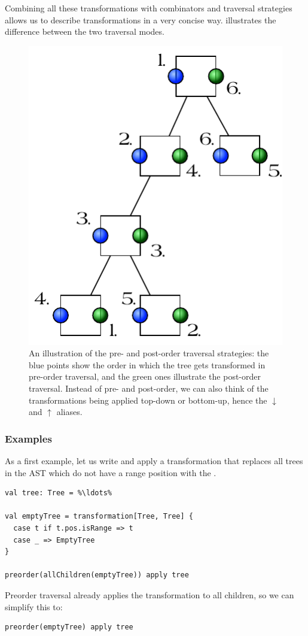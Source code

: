 Combining all these transformations with combinators and traversal strategies allows us to describe transformations in a very concise way.  illustrates the difference between the two traversal modes.

\begin{figure}
 \centering
 \includegraphics[width=0.4\linewidth]{traversal_mode.pdf}
 \caption{An illustration of the pre- and post-order traversal strategies: the blue points show the order in which the tree gets transformed in pre-order traversal, and the green ones illustrate the post-order traversal. Instead of pre- and post-order, we can also think of the transformations being applied top-down or bottom-up, hence the $\downarrow$ and $\uparrow$ aliases.}
 \label{figure:traversal_mode}
\end{figure}

\subsubsection{Examples}

As a first example, let us write and apply a transformation that replaces all trees in the AST which do not have a range position with the .

\begin{lstlisting}
val tree: Tree = %\ldots%

val emptyTree = transformation[Tree, Tree] {
  case t if t.pos.isRange => t
  case _ => EmptyTree
}

preorder(allChildren(emptyTree)) apply tree
\end{lstlisting}

Preorder traversal already applies the transformation to all children, so we can simplify this to:

\begin{lstlisting}
preorder(emptyTree) apply tree
\end{lstlisting}

